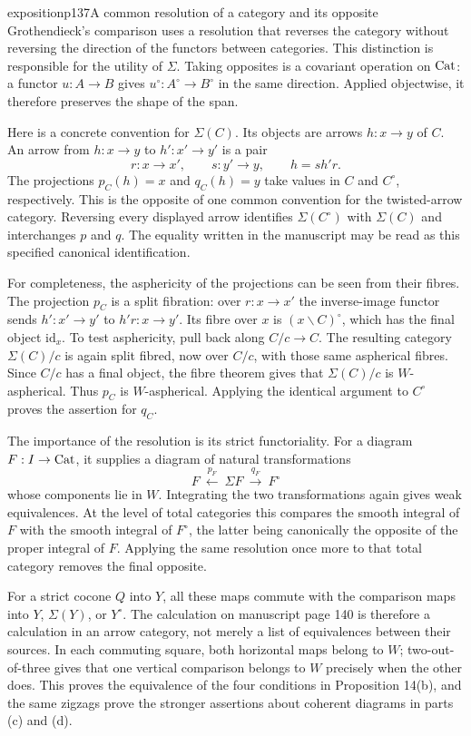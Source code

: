 \begin{dcomment}{exposition}{p137}{A common resolution of a category and its opposite}
Grothendieck's comparison uses a resolution that reverses the category without reversing the direction of the functors between categories. This distinction is responsible for the utility of $\Sigma$. Taking opposites is a covariant operation on $\mathrm{Cat}$: a functor $u:A\to B$ gives $u^\circ:A^\circ\to B^\circ$ in the same direction. Applied objectwise, it therefore preserves the shape of the span.

Here is a concrete convention for $\Sigma(C)$. Its objects are arrows $h:x\to y$ of $C$. An arrow from $h:x\to y$ to $h':x'\to y'$ is a pair
\[
 r:x\to x',\qquad s:y'\to y,
 \qquad h=s h'r.
\]
The projections $p_C(h)=x$ and $q_C(h)=y$ take values in $C$ and $C^\circ$, respectively. This is the opposite of one common convention for the twisted-arrow category. Reversing every displayed arrow identifies $\Sigma(C^\circ)$ with $\Sigma(C)$ and interchanges $p$ and $q$. The equality written in the manuscript may be read as this specified canonical identification.

For completeness, the asphericity of the projections can be seen from their fibres. The projection $p_C$ is a split fibration: over $r:x\to x'$ the inverse-image functor sends $h':x'\to y'$ to $h'r:x\to y'$. Its fibre over $x$ is $(x\backslash C)^\circ$, which has the final object $\mathrm{id}_x$. To test asphericity, pull back along $C/c\to C$. The resulting category $\Sigma(C)/c$ is again split fibred, now over $C/c$, with those same aspherical fibres. Since $C/c$ has a final object, the fibre theorem gives that $\Sigma(C)/c$ is $W$-aspherical. Thus $p_C$ is $W$-aspherical. Applying the identical argument to $C^\circ$ proves the assertion for $q_C$.

The importance of the resolution is its strict functoriality. For a diagram $F:I\to\mathrm{Cat}$, it supplies a diagram of natural transformations
\[
 F\ \xleftarrow{p_F}\ \Sigma F\ \xrightarrow{q_F}\ F^\circ
\]
whose components lie in $W$. Integrating the two transformations again gives weak equivalences. At the level of total categories this compares the smooth integral of $F$ with the smooth integral of $F^\circ$, the latter being canonically the opposite of the proper integral of $F$. Applying the same resolution once more to that total category removes the final opposite.

For a strict cocone $Q$ into $Y$, all these maps commute with the comparison maps into $Y$, $\Sigma(Y)$, or $Y^\circ$. The calculation on manuscript page 140 is therefore a calculation in an arrow category, not merely a list of equivalences between their sources. In each commuting square, both horizontal maps belong to $W$; two-out-of-three gives that one vertical comparison belongs to $W$ precisely when the other does. This proves the equivalence of the four conditions in Proposition 14(b), and the same zigzags prove the stronger assertions about coherent diagrams in parts (c) and (d).


\end{dcomment}

